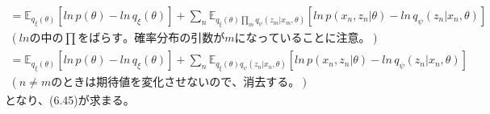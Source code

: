 ﻿\documentclass{jsarticle}
\begin{document}
\begin{equation}
\begin{split}
= \mathbb{E}_{q_{\xi}(\theta)}[ln \, p(\theta) - ln \, q_{\xi}(\theta)] + \sum_n \mathbb{E}_{q_{\xi}(\theta) \prod_m q_{\psi}(z_m | x_m, \theta)}[ln \, p(x_n, z_n | \theta) - ln \, q_{\psi}(z_n | x_n, \theta)]\\
(lnの中の \prod をばらす。確率分布の引数がmになっていることに注意。)\\
= \mathbb{E}_{q_{\xi}(\theta)}[ln \, p(\theta) - ln \, q_{\xi}(\theta)] + \sum_n \mathbb{E}_{q_{\xi}(\theta) q_{\psi}(z_n | x_n, \theta)}[ln \, p(x_n, z_n | \theta) - ln \, q_{\psi}(z_n | x_n, \theta)]\\
(n \neq mのときは期待値を変化させないので、消去する。)
\end{split}
\end{equation}
となり、(6.45)が求まる。
\end{document}

